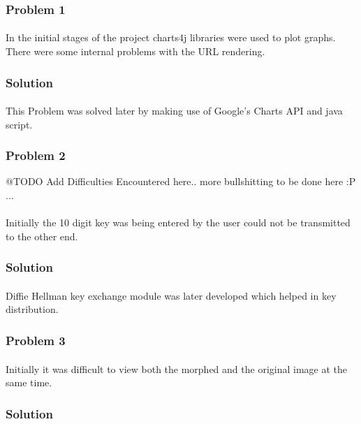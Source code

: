 \documentclass[12pt]{report}
\begin{document}
\subsubsection{Problem 1}
\paragraph{}In the initial stages of the project charts4j libraries were used to plot graphs. There were some internal problems with the URL rendering.

\subsubsection{Solution}
\paragraph{}This Problem was solved later by making use of Google's Charts API and java script. 
\subsubsection{Problem 2}
@TODO Add Difficulties Encountered here.. more bullshitting to be done here :P ...
\paragraph{}Initially the 10 digit key was being entered by the user could not be transmitted to the other end.
\subsubsection{Solution}
\paragraph{}Diffie Hellman key exchange module was later developed which helped in key distribution.
\subsubsection{Problem 3}
\paragraph{}Initially it was difficult to view both the morphed and the original image at the same time.
\subsubsection{Solution}
\end{document}
